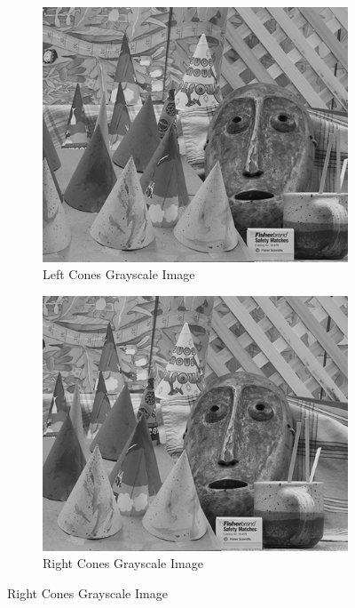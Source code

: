 \begin{figure}
\begin{center}
	\begin{subfigure}{0.45\textwidth}
		\includegraphics[width=\textwidth]{figures/conesL.png}
		\caption{Left Cones Grayscale Image}
		\label{fig:conesL}
	\end{subfigure}
	\begin{subfigure}{0.45\textwidth}
		\includegraphics[width=\textwidth]{figures/conesR.png}
		\caption{Right Cones Grayscale Image}
		\label{fig:conesR}

\end{subfigure}
\end{center}
\end{figure}
